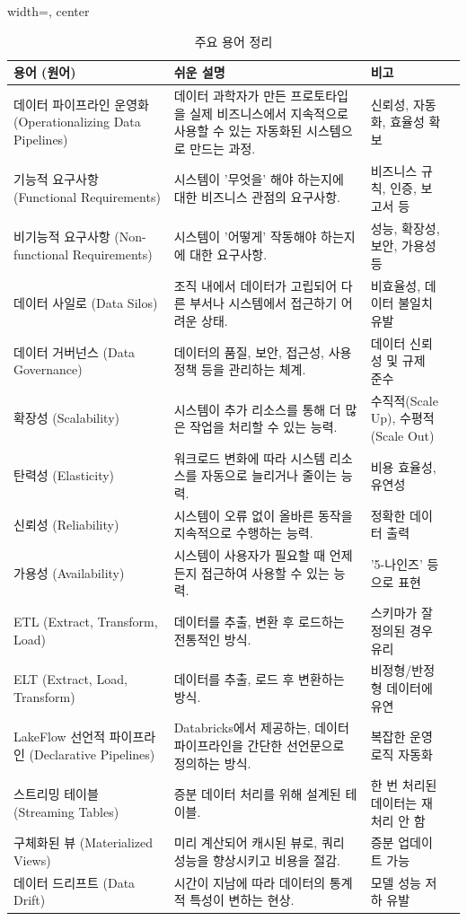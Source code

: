 \documentclass[11pt,a4paper]{article}
\theoremstyle{definition}
\begin{document}
\begin{table}[h!]
\centering
\caption{주요 용어 정리}
\label{tab:glossary}
\begin{adjustbox}{width=\textwidth, center}
\begin{tabular}{lllc}
\toprule
\textbf{용어 (원어)} & \textbf{쉬운 설명} & \textbf{비고} \\
\midrule
데이터 파이프라인 운영화 (Operationalizing Data Pipelines) & 데이터 과학자가 만든 프로토타입을 실제 비즈니스에서 지속적으로 사용할 수 있는 자동화된 시스템으로 만드는 과정. & 신뢰성, 자동화, 효율성 확보 \\
기능적 요구사항 (Functional Requirements) & 시스템이 '무엇을' 해야 하는지에 대한 비즈니스 관점의 요구사항. & 비즈니스 규칙, 인증, 보고서 등 \\
비기능적 요구사항 (Non-functional Requirements) & 시스템이 '어떻게' 작동해야 하는지에 대한 요구사항. & 성능, 확장성, 보안, 가용성 등 \\
데이터 사일로 (Data Silos) & 조직 내에서 데이터가 고립되어 다른 부서나 시스템에서 접근하기 어려운 상태. & 비효율성, 데이터 불일치 유발 \\
데이터 거버넌스 (Data Governance) & 데이터의 품질, 보안, 접근성, 사용 정책 등을 관리하는 체계. & 데이터 신뢰성 및 규제 준수 \\
확장성 (Scalability) & 시스템이 추가 리소스를 통해 더 많은 작업을 처리할 수 있는 능력. & 수직적(Scale Up), 수평적(Scale Out) \\
탄력성 (Elasticity) & 워크로드 변화에 따라 시스템 리소스를 자동으로 늘리거나 줄이는 능력. & 비용 효율성, 유연성 \\
신뢰성 (Reliability) & 시스템이 오류 없이 올바른 동작을 지속적으로 수행하는 능력. & 정확한 데이터 출력 \\
가용성 (Availability) & 시스템이 사용자가 필요할 때 언제든지 접근하여 사용할 수 있는 능력. & '5-나인즈' 등으로 표현 \\
ETL (Extract, Transform, Load) & 데이터를 추출, 변환 후 로드하는 전통적인 방식. & 스키마가 잘 정의된 경우 유리 \\
ELT (Extract, Load, Transform) & 데이터를 추출, 로드 후 변환하는 방식. & 비정형/반정형 데이터에 유연 \\
LakeFlow 선언적 파이프라인 (Declarative Pipelines) & Databricks에서 제공하는, 데이터 파이프라인을 간단한 선언문으로 정의하는 방식. & 복잡한 운영 로직 자동화 \\
스트리밍 테이블 (Streaming Tables) & 증분 데이터 처리를 위해 설계된 테이블. & 한 번 처리된 데이터는 재처리 안 함 \\
구체화된 뷰 (Materialized Views) & 미리 계산되어 캐시된 뷰로, 쿼리 성능을 향상시키고 비용을 절감. & 증분 업데이트 가능 \\
데이터 드리프트 (Data Drift) & 시간이 지남에 따라 데이터의 통계적 특성이 변하는 현상. & 모델 성능 저하 유발 \\
\bottomrule
\end{tabular}
\end{adjustbox}
\end{table}
\end{document}
